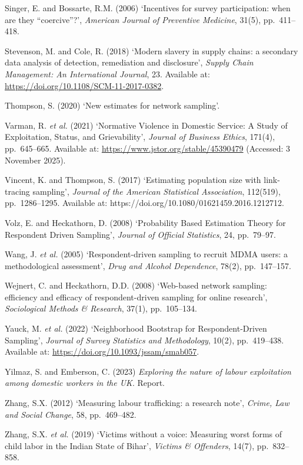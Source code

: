 \documentclass[
  12pt,
  letterpaper,
  DIV=11,
  numbers=noendperiod]{scrartcl}
\begin{document}
Singer, E. and Bossarte, R.M. (2006) `Incentives for survey
participation: when are they ``coercive''?', \emph{American Journal of
Preventive Medicine}, 31(5), pp.~411--418.

Stevenson, M. and Cole, R. (2018) `Modern slavery in supply chains: a
secondary data analysis of detection, remediation and disclosure',
\emph{Supply Chain Management: An International Journal}, 23. Available
at: \url{https://doi.org/10.1108/SCM-11-2017-0382}.

Thompson, S. (2020) `New estimates for network sampling'.

Varman, R. \emph{et al.} (2021) `Normative Violence in Domestic Service:
A Study of Exploitation, Status, and Grievability', \emph{Journal of
Business Ethics}, 171(4), pp.~645--665. Available at:
\url{https://www.jstor.org/stable/45390479} (Accessed: 3 November 2025).

Vincent, K. and Thompson, S. (2017) `Estimating population size with
link-tracing sampling', \emph{Journal of the American Statistical
Association}, 112(519), pp.~1286--1295. Available at:
https://doi.org/10.1080/01621459.2016.1212712.

Volz, E. and Heckathorn, D. (2008) `Probability Based Estimation Theory
for Respondent Driven Sampling', \emph{Journal of Official Statistics},
24, pp.~79--97.

Wang, J. \emph{et al.} (2005) `Respondent-driven sampling to recruit
MDMA users: a methodological assessment', \emph{Drug and Alcohol
Dependence}, 78(2), pp.~147--157.

Wejnert, C. and Heckathorn, D.D. (2008) `Web-based network sampling:
efficiency and efficacy of respondent-driven sampling for online
research', \emph{Sociological Methods \& Research}, 37(1), pp.~105--134.

Yauck, M. \emph{et al.} (2022) `Neighborhood Bootstrap for
Respondent-Driven Sampling', \emph{Journal of Survey Statistics and
Methodology}, 10(2), pp.~419--438. Available at:
\url{https://doi.org/10.1093/jssam/smab057}.

Yilmaz, S. and Emberson, C. (2023) \emph{Exploring the nature of labour
exploitation among domestic workers in the UK}. Report.

Zhang, S.X. (2012) `Measuring labour trafficking: a research note',
\emph{Crime, Law and Social Change}, 58, pp.~469--482.

Zhang, S.X. \emph{et al.} (2019) `Victims without a voice: Measuring
worst forms of child labor in the Indian State of Bihar', \emph{Victims
\& Offenders}, 14(7), pp.~832--858.


\printbibliography
\end{document}
